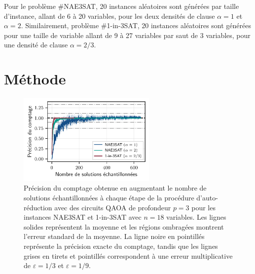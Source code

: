 Pour le problème \#NAE3SAT, 20 instances aléatoires sont générées par taille d'instance, allant de 6 à 20 variables, pour les deux densités de clause $\alpha=1$ et $\alpha = 2$. Similairement, problème \#1-in-3SAT, 20 instances aléatoires sont générées pour une taille de variable allant de 9 à 27 variables par saut de 3 variables, pour une densité de clause $\alpha = 2/3$. 


\section{Méthode}
\label{sec:methode}
\begin{figure}[ht!]
    \centering
    \includegraphics[width=0.6\textwidth]{figures/count-accuracy.pdf}
    \caption[Précision du comptage pour des problèmes \textsf{\#P}-difficile]{Précision du comptage obtenue en augmentant le nombre de solutions échantillonnées à chaque étape de la procédure d'auto-réduction avec des circuits QAOA de profondeur $p=3$ pour les instances NAE3SAT et 1-in-3SAT avec $n=18$ variables. Les lignes solides représentent la moyenne et les régions ombragées montrent l'erreur standard de la moyenne. La ligne noire en pointillés représente la précision exacte du comptage, tandis que les lignes grises en tirets et pointillés correspondent à une erreur multiplicative de $\varepsilon = 1/3$ et $\varepsilon = 1/9$.}
    \label{fig:count-accuracy.pdf}
\end{figure}

